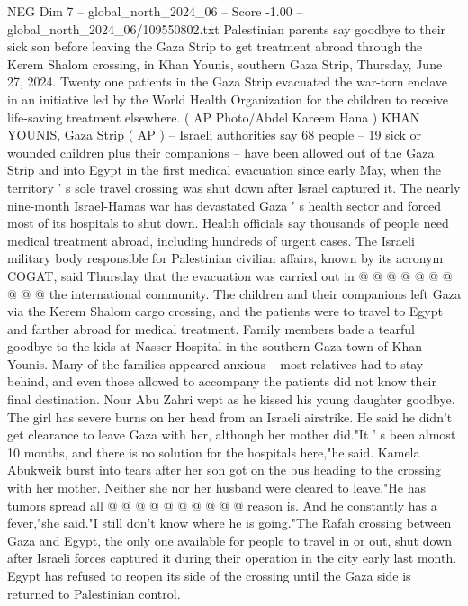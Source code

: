 \begin{textsample}{NEG Dim 7 – global\_north\_2024\_06 – Score -1.00 – global\_north\_2024\_06/109550802.txt}  \label{ex:f7_neg_372}
Palestinian parents say goodbye to their sick son before leaving the Gaza Strip to get treatment abroad through the Kerem Shalom crossing, in Khan Younis, southern Gaza Strip, Thursday, June 27, 2024.
Twenty one patients in the Gaza Strip evacuated the war-torn enclave in an initiative led by the World Health Organization for the children to receive life-saving treatment elsewhere. ( AP Photo/Abdel Kareem Hana ) KHAN YOUNIS, Gaza Strip ( AP ) -- Israeli authorities say 68 people -- 19 sick or wounded children plus their companions -- have been allowed out of the Gaza Strip and into Egypt in the first medical evacuation since early May, when the territory ' s sole travel crossing was shut down after Israel captured it.
The nearly nine-month Israel-Hamas war has devastated Gaza ' s health sector and forced most of its hospitals to shut down.
Health officials say thousands of people need medical treatment abroad, including hundreds of urgent cases.
The Israeli military body responsible for Palestinian civilian affairs, known by its acronym COGAT, said Thursday that the evacuation was carried out in @ @ @ @ @ @ @ @ @ @ the international community.
The children and their companions left Gaza via the Kerem Shalom cargo crossing, and the patients were to travel to Egypt and farther abroad for medical treatment.
Family members bade a tearful goodbye to the kids at Nasser Hospital in the southern Gaza town of Khan Younis.
Many of the families appeared anxious -- most relatives had to stay behind, and even those allowed to accompany the patients did not know their final destination.
Nour Abu Zahri wept as he kissed his young daughter goodbye.
The girl has severe burns on her head from an Israeli airstrike.
He said he didn't get clearance to leave Gaza with her, although her mother did."It ' s been almost 10 months, and there is no solution for the hospitals here,"he said.
Kamela Abukweik burst into tears after her son got on the bus heading to the crossing with her mother.
Neither she nor her husband were cleared to leave."He has tumors spread all @ @ @ @ @ @ @ @ @ @ reason is.
And he constantly has a fever,"she said."I still don't know where he is going."The Rafah crossing between Gaza and Egypt, the only one available for people to travel in or out, shut down after Israeli forces captured it during their operation in the city early last month.
Egypt has refused to reopen its side of the crossing until the Gaza side is returned to Palestinian control.

\end{textsample}
